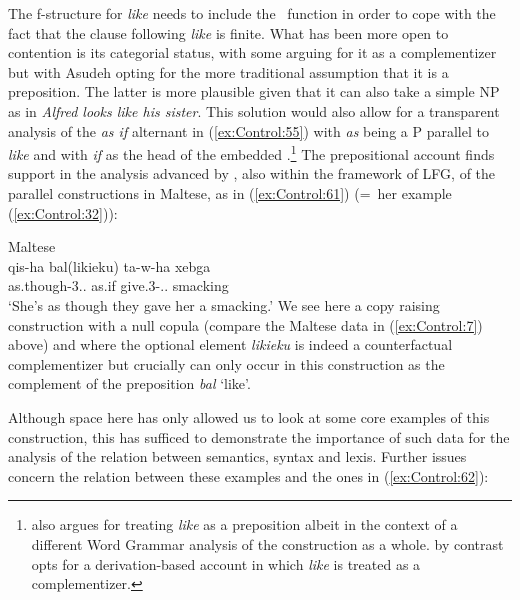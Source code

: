 \documentclass[output=paper,hidelinks]{langscibook}
\begin{document}
\ea\label{ex:Control:59} 
\z

\ea\label{ex:Control:60}  
\z
The f-structure for \emph{like} needs to include the \COMP\ function in order to cope with the fact that the clause following \emph{like} is finite. What has been more open to contention is its categorial status, with some arguing for it as a complementizer but with Asudeh opting for the more traditional assumption that it is a preposition. The latter is more plausible given that it can also take a simple NP as in \emph{Alfred looks like his sister}. This solution would also allow for a transparent analysis of the \emph{as if} alternant in (\ref{ex:Control:55}) with \emph{as} being a P parallel to \emph{like} and with \emph{if} as the  head of the embedded \COMP.\footnote{\citet[chapter~7]{Gisborne2010} also argues for treating \emph{like} as a preposition albeit in the context of a different Word Grammar analysis of the construction as a whole. \citet{Landau2011} by contrast opts for a derivation-based account in which \emph{like} is treated as a complementizer.} The prepositional account finds support in the analysis advanced by \citet{Camilleri2018}, also within the framework of LFG, of the parallel constructions in Maltese, as in (\ref{ex:Control:61}) (=~her example (\ref{ex:Control:32})):

\ea\label{ex:Control:61}Maltese\\
\gll qis-ha      b{\textcrh}al(likieku)  ta-w-ha  xebg{\textcrh}a\\
 {as.though-3\F.\SG.\ACC}  as.if     {give.3\PFV-\F.\SG.\ACC} smacking\\
\glt `She's as though they gave her a smacking.'
 \z
We see here a copy raising construction with a null copula (compare the Maltese data in (\ref{ex:Control:7}) above) and where the optional element \emph{likieku} is indeed a counterfactual complementizer but crucially can only occur in this construction as the complement of the preposition \emph{b{\textcrh}al} `like'.

Although space here has only allowed us to look at some core examples of this construction, this has sufficed to demonstrate the importance of such data for the analysis of the relation between semantics, syntax and lexis. Further issues concern the relation between these examples and the ones in (\ref{ex:Control:62}):
\end{document}
